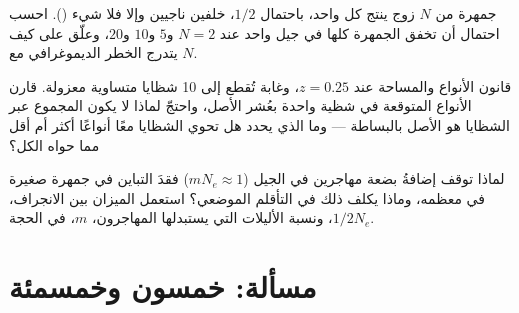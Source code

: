 \begin{exercise}[$\star\star\star$]\label{exo:b3:conservation-biology:10}
جمهرة من $N$ زوج ينتج كل واحد، باحتمال $1/2$، خلفين
ناجيين وإلا فلا شيء ().
احسب احتمال أن تخفق الجمهرة كلها في جيل
واحد عند $N = 2$ و$5$ و$10$ و$20$، وعلّق على كيف يتدرج
الخطر الديموغرافي مع $N$.
\end{exercise}

\begin{exercise}[$\star\star\star$]\label{exo:b3:conservation-biology:11}
قانون الأنواع والمساحة عند $z = 0.25$، وغابة تُقطع إلى 10 شظايا
متساوية معزولة. قارن الأنواع المتوقعة في شظية واحدة
بعُشر الأصل، واحتجّ لماذا لا يكون المجموع عبر الشظايا
هو الأصل بالبساطة --- وما الذي يحدد هل تحوي الشظايا
معًا أنواعًا أكثر أم أقل مما حواه الكل؟
\end{exercise}

\begin{exercise}[$\star\star\star$]\label{exo:b3:conservation-biology:12}
لماذا توقف إضافةُ بضعة مهاجرين في الجيل ($m N_{e} \approx 1$)
فقدَ التباين في جمهرة صغيرة في معظمه، وماذا يكلف ذلك
في التأقلم الموضعي؟ استعمل الميزان بين الانجراف، $1/2N_{e}$،
ونسبة الأليلات التي يستبدلها المهاجرون، $m$، في الحجة.
\end{exercise}

\section{مسألة: خمسون وخمسمئة}

